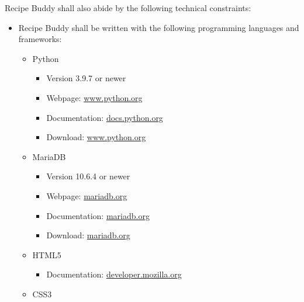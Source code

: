 \documentclass{scrreprt}
\begin{document}
\gls{Recipe Buddy} shall also abide by the following technical constraints:
\begin{itemize}
    \item \gls{Recipe Buddy} shall be written with the following programming languages and frameworks:
    \begin{itemize}

        \item \gls{Python}
        \begin{itemize}

            \item Version 3.9.7 or newer
            \item Webpage: \href{https://www.python.org/}{www.python.org}
            \item \gls{Documentation}: \href{https://docs.python.org/3.9/}{docs.python.org}
            \item Download: \href{https://www.python.org/downloads/release/python-397/}{www.python.org}

        \end{itemize}

        \item \gls{MariaDB}
        \begin{itemize}

            \item Version 10.6.4 or newer
            \item Webpage: \href{https://mariadb.org/}{mariadb.org}
            \item \gls{Documentation}: \href{https://mariadb.com/kb/en/}{mariadb.org}
            \item Download: \href{https://mariadb.org/download/?tab=mariadb&release=10.6.4&product=mariadb}{mariadb.org}
        
        \end{itemize}
        
        \item \gls{HTML}5
        \begin{itemize}
        
            \item \gls{Documentation}: \href{https://developer.mozilla.org/en-US/docs/Web/HTML}{developer.mozilla.org}
        
        \end{itemize}
        
        \item \gls{CSS}3
        \begin{itemize}
        

\end{itemize}
\end{itemize}
\end{itemize}
\end{document}
